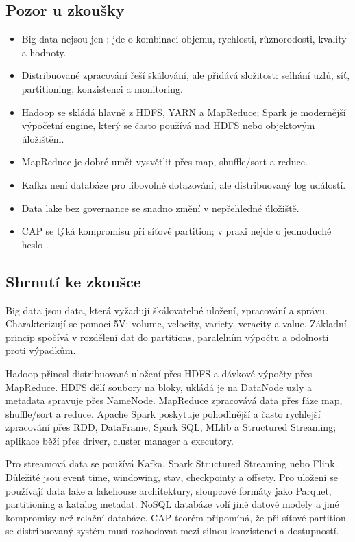 \subsection{Pozor u zkoušky}

\begin{itemize}
    \item Big data nejsou jen ; jde o kombinaci objemu, rychlosti, různorodosti,
    kvality a hodnoty.
    \item Distribuované zpracování řeší škálování, ale přidává složitost: selhání uzlů, síť, partitioning,
    konzistenci a monitoring.
    \item Hadoop se skládá hlavně z HDFS, YARN a MapReduce; Spark je modernější výpočetní engine, který
    se často používá nad HDFS nebo objektovým úložištěm.
    \item MapReduce je dobré umět vysvětlit přes map, shuffle/sort a reduce.
    \item Kafka není databáze pro libovolné dotazování, ale distribuovaný log událostí.
    \item Data lake bez governance se snadno změní v nepřehledné úložiště.
    \item CAP se týká kompromisu při síťové partition; v praxi nejde o jednoduché heslo .
\end{itemize}

\subsection{Shrnutí ke zkoušce}

Big data jsou data, která vyžadují škálovatelné uložení, zpracování a správu. Charakterizují se pomocí
5V: volume, velocity, variety, veracity a value. Základní princip spočívá v rozdělení dat do partitions,
paralelním výpočtu a odolnosti proti výpadkům.

Hadoop přinesl distribuované uložení přes HDFS a dávkové výpočty přes MapReduce. HDFS dělí soubory na
bloky, ukládá je na DataNode uzly a metadata spravuje přes NameNode. MapReduce zpracovává data přes fáze
map, shuffle/sort a reduce. Apache Spark poskytuje pohodlnější a často rychlejší zpracování přes RDD,
DataFrame, Spark SQL, MLlib a Structured Streaming; aplikace běží přes driver, cluster manager a executory.

Pro streamová data se používá Kafka, Spark Structured Streaming nebo Flink. Důležité jsou event time,
windowing, stav, checkpointy a offsety. Pro uložení se používají data lake a lakehouse architektury,
sloupcové formáty jako Parquet, partitioning a katalog metadat. NoSQL databáze volí jiné datové modely
a jiné kompromisy než relační databáze. CAP teorém připomíná, že při síťové partition se distribuovaný
systém musí rozhodovat mezi silnou konzistencí a dostupností.

